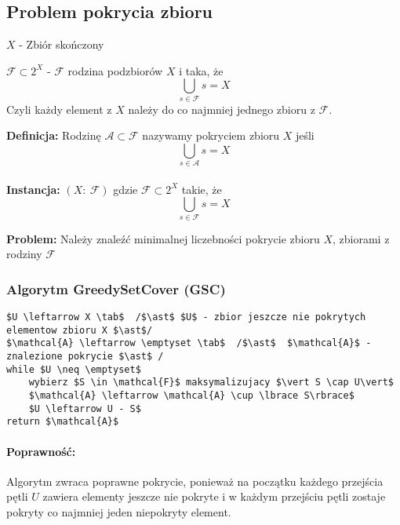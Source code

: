 \subsection{Problem pokrycia zbioru}
$X$ - Zbiór skończony

$\mathcal{F} \subset 2^{X}$ - $\mathcal{F}$ rodzina podzbiorów $X$ i taka, że $$\bigcup_{s\in \mathcal{F}}s = X$$ 
Czyli każdy element z $X$ należy do co najmniej jednego zbioru z $\mathcal{F}$.

\textbf{Definicja: }Rodzinę $\mathcal{A}\subset \mathcal{F}$ nazywamy pokryciem zbioru $X$ jeśli $$\bigcup_{s\in \mathcal{A}}s = X$$
\\
\textbf{Instancja: }$(X:\ \mathcal{F})$ gdzie $\mathcal{F} \subset 2^{X}$ takie, że $$\bigcup_{s\in \mathcal{F}}s = X$$

\textbf{Problem: }Należy znaleźć minimalnej liczebności pokrycie zbioru $X$, zbiorami z rodziny $\mathcal{F}$

\subsubsection{Algorytm GreedySetCover (GSC)}
\begin{lstlisting}[caption={GreedySetCover(X,F)}]
$U \leftarrow X \tab$  /$\ast$ $U$ - zbior jeszcze nie pokrytych elementow zbioru X $\ast$/
$\mathcal{A} \leftarrow \emptyset \tab$  /$\ast$  $\mathcal{A}$ - znalezione pokrycie $\ast$ /
while $U \neq \emptyset$
	wybierz $S \in \mathcal{F}$ maksymalizujacy $\vert S \cap U\vert$
	$\mathcal{A} \leftarrow \mathcal{A} \cup \lbrace S\rbrace$
	$U \leftarrow U - S$
return $\mathcal{A}$
\end{lstlisting}

\paragraph{Poprawność: }
Algorytm zwraca poprawne pokrycie, ponieważ na początku każdego przejścia pętli $U$ zawiera elementy jeszcze nie pokryte i w każdym przejściu pętli zostaje pokryty co najmniej jeden niepokryty element.

